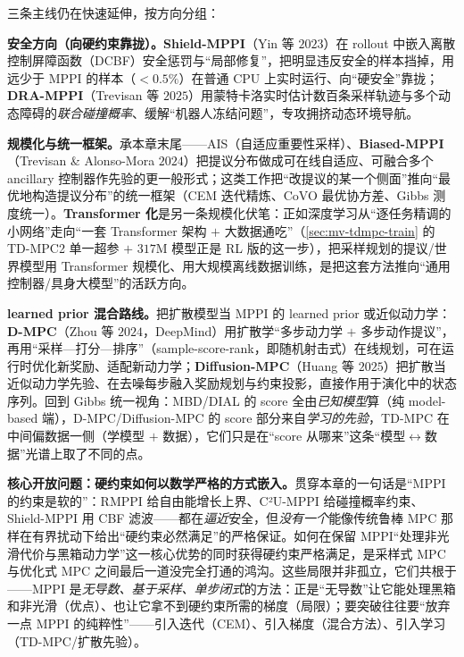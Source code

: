 三条主线仍在快速延伸，按方向分组：

\textbf{安全方向（向硬约束靠拢）。}\;\textbf{Shield-MPPI}（Yin 等 $2023$）在 rollout 中嵌入离散控制屏障函数（DCBF）安全惩罚与“局部修复”，把明显违反安全的样本挡掉，用远少于 MPPI 的样本（$<0.5\%$）在普通 CPU 上实时运行、向“硬安全”靠拢\cite{yin2023shield}；\textbf{DRA-MPPI}（Trevisan 等 $2025$）用蒙特卡洛实时估计数百条采样轨迹与多个动态障碍的\emph{联合碰撞概率}、缓解“机器人冻结问题”，专攻拥挤动态环境导航。

\textbf{规模化与统一框架。}\;承本章末尾——AIS（自适应重要性采样）、\textbf{Biased-MPPI}（Trevisan \& Alonso-Mora $2024$）把提议分布做成可在线自适应、可融合多个 ancillary 控制器作先验的更一般形式\cite{trevisan2024biased}；这类工作把“改提议的某一个侧面”推向“最优地构造提议分布”的统一框架（CEM 迭代精炼、CoVO 最优协方差、Gibbs 测度统一）。\textbf{Transformer 化}是另一条规模化伏笔：正如深度学习从“逐任务精调的小网络”走向“一套 Transformer 架构 $+$ 大数据通吃”（\cref{sec:mv-tdmpc-train} 的 TD-MPC2 单一超参 $+$ $317$M 模型正是 RL 版的这一步），把采样规划的提议/世界模型用 Transformer 规模化、用大规模离线数据训练，是把这套方法推向“通用控制器/具身大模型”的活跃方向。

\textbf{learned prior 混合路线。}\;把扩散模型当 MPPI 的 learned prior 或近似动力学：\textbf{D-MPC}（Zhou 等 $2024$，DeepMind）用扩散学“多步动力学 $+$ 多步动作提议”，再用“采样—打分—排序”（sample-score-rank，即随机射击式）在线规划，可在运行时优化新奖励、适配新动力学\cite{zhou2024dmpc}；\textbf{Diffusion-MPC}（Huang 等 $2025$）把扩散当近似动力学先验、在去噪每步融入奖励规划与约束投影，直接作用于演化中的状态序列\cite{huang2025diffusionmpc}。回到 Gibbs 统一视角：MBD/DIAL 的 score 全由\emph{已知模型}算（纯 model-based 端），D-MPC/Diffusion-MPC 的 score 部分来自\emph{学习的先验}，TD-MPC 在中间偏数据一侧（学模型 $+$ 数据），它们只是在“score 从哪来”这条“模型$\leftrightarrow$数据”光谱上取了不同的点。

\textbf{核心开放问题：硬约束如何以数学严格的方式嵌入。}\;贯穿本章的一句话是“MPPI 的约束是软的”：RMPPI 给自由能增长上界、C²U-MPPI 给碰撞概率约束、Shield-MPPI 用 CBF 滤波——都在\emph{逼近}安全，但\emph{没有一个}能像传统鲁棒 MPC 那样在有界扰动下给出“硬约束必然满足”的严格保证。如何在保留 MPPI“处理非光滑代价与黑箱动力学”这一核心优势的同时获得硬约束严格满足，是采样式 MPC 与优化式 MPC 之间最后一道没完全打通的鸿沟。这些局限并非孤立，它们共根于——MPPI 是\emph{无导数、基于采样、单步闭式}的方法：正是“无导数”让它能处理黑箱和非光滑（优点）、也让它拿不到硬约束所需的梯度（局限）；要突破往往要“放弃一点 MPPI 的纯粹性”——引入迭代（CEM）、引入梯度（混合方法）、引入学习（TD-MPC/扩散先验）。

